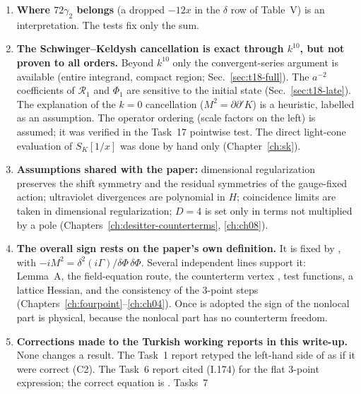 \begin{enumerate}[leftmargin=18pt,itemsep=2pt]
30-digit precision. They are not symbolic identities, and they check only sums (Secs.~\ref{ch6:tableV}, \ref{sec:ch08-global}). Some other checks are
dimension-specific: the gauge-breaking Euler--Lagrange check is done in $D=3$; counterterm completeness was checked for all 15 candidates only at
$D=4,5,6$, with general-$D$ formulas derived for 11 of them, contrary to the Task~15 report's wording (Chapter~\ref{ch:desitter-counterterms});
the pointwise check of the nonlocal part of -- is done at $D=4$ (Chapter~\ref{ch:ch04}).
\item \textbf{Where $72\gamma_2$ belongs} (a dropped $-12x$ in the $\delta$ row of Table~V) is an interpretation. The tests fix only the sum.
\item \textbf{The Schwinger--Keldysh cancellation is exact through $k^{10}$, but not proven to all orders.} Beyond $k^{10}$ only the convergent-series
argument is available (entire integrand, compact region; Sec.~\ref{sec:t18-full}). The $a^{-2}$ coefficients of $\mathcal R_1$ and $\Phi_1$ are
sensitive to the initial state (Sec.~\ref{sec:t18-late}). The explanation of the $k=0$ cancellation ($M^2=\partial\partial'K$) is a heuristic,
labelled as an assumption. The operator ordering (scale factors on the left) is assumed; it was verified in the Task~17 pointwise test. The direct
light-cone evaluation of $S_K[1/x]$ was done by hand only (Chapter~\ref{ch:sk}).
\item \textbf{Assumptions shared with the paper:} dimensional regularization preserves the shift symmetry and the residual symmetries of the
gauge-fixed action; ultraviolet divergences are polynomial in $H$; coincidence limits are taken in dimensional regularization; $D=4$ is set only in
terms not multiplied by a pole (Chapters~\ref{ch:desitter-counterterms}, \ref{ch:ch08}).
\item \textbf{The overall sign rests on the paper's own definition.} It is fixed by , with
$-iM^2=\delta^2(i\Gamma)/\delta\Phi\,\delta\Phi$. Several
independent lines support it: Lemma~A, the field-equation route, the counterterm vertex , test functions, a lattice Hessian, and
the consistency of the 3-point steps (Chapters~\ref{ch:fourpoint}--\ref{ch:ch04}). Once  is adopted the sign of the nonlocal part is physical,
because the nonlocal part has no counterterm freedom.
\item \textbf{Corrections made to the Turkish working reports in this write-up.} None changes a result. The Task~1 report retyped the left-hand side
of  as if it were correct (C2). The Task~6 report cited (I.174) for the flat 3-point expression; the correct equation is . Tasks~7

\end{enumerate}
